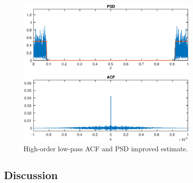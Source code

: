 \begin{figure}[h]
\centering
\includegraphics[width=0.8\textwidth]{bilder/Lab1/Lab1fig10.eps}
\caption{High-order low-pass ACF and PSD improved estimate.}
\label{fig:Lab1fig10}
\end{figure}



\subsection{Discussion}
